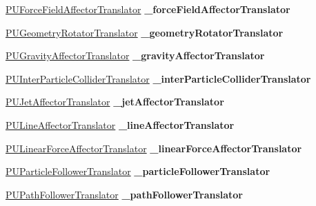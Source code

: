 \begin{DoxyCompactItemize}
\hyperlink{classPUForceFieldAffectorTranslator}{P\+U\+Force\+Field\+Affector\+Translator} {\bfseries \+\_\+force\+Field\+Affector\+Translator}
\item 
\mbox{\label{classPUAffectorManager_a6b6ca21ad4d1c0339596c5b1b9427cfc}} 
\hyperlink{classPUGeometryRotatorTranslator}{P\+U\+Geometry\+Rotator\+Translator} {\bfseries \+\_\+geometry\+Rotator\+Translator}
\item 
\mbox{\label{classPUAffectorManager_a99255c081c9d04adb115c12013d8ffce}} 
\hyperlink{classPUGravityAffectorTranslator}{P\+U\+Gravity\+Affector\+Translator} {\bfseries \+\_\+gravity\+Affector\+Translator}
\item 
\mbox{\label{classPUAffectorManager_ad3dcea62cb04c322dbb8c483cb76add7}} 
\hyperlink{classPUInterParticleColliderTranslator}{P\+U\+Inter\+Particle\+Collider\+Translator} {\bfseries \+\_\+inter\+Particle\+Collider\+Translator}
\item 
\mbox{\label{classPUAffectorManager_a86317efe21fce8fe29bc65d3c9731a87}} 
\hyperlink{classPUJetAffectorTranslator}{P\+U\+Jet\+Affector\+Translator} {\bfseries \+\_\+jet\+Affector\+Translator}
\item 
\mbox{\label{classPUAffectorManager_a1b85139f5127e59434de20c4ba9e90c9}} 
\hyperlink{classPULineAffectorTranslator}{P\+U\+Line\+Affector\+Translator} {\bfseries \+\_\+line\+Affector\+Translator}
\item 
\mbox{\label{classPUAffectorManager_ae0b83f222df6a9e9aec2633eb42ac756}} 
\hyperlink{classPULinearForceAffectorTranslator}{P\+U\+Linear\+Force\+Affector\+Translator} {\bfseries \+\_\+linear\+Force\+Affector\+Translator}
\item 
\mbox{\label{classPUAffectorManager_a971377cb8cae8b31baa160ac49a8b3d1}} 
\hyperlink{classPUParticleFollowerTranslator}{P\+U\+Particle\+Follower\+Translator} {\bfseries \+\_\+particle\+Follower\+Translator}
\item 
\mbox{\label{classPUAffectorManager_a2bec1d4ef1759a4af25130418edf71de}} 
\hyperlink{classPUPathFollowerTranslator}{P\+U\+Path\+Follower\+Translator} {\bfseries \+\_\+path\+Follower\+Translator}

\end{DoxyCompactItemize}
